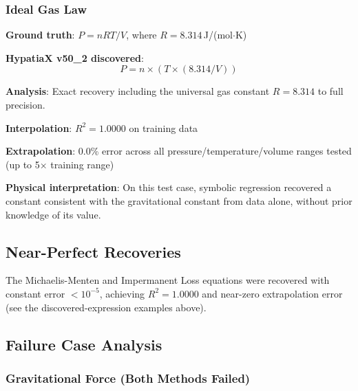\documentclass[twoside,11pt]{article}
\begin{document}
\subsubsection{Ideal Gas Law}

\begin{example}
\textbf{Ground truth}: $P = nRT/V$, where $R = 8.314$\,J/(mol$\cdot$K)

\textbf{HypatiaX v50\_2 discovered}:
\begin{equation}
P = n \times (T \times (8.314 / V))
\end{equation}

\textbf{Analysis}: Exact recovery including the universal gas constant $R = 8.314$ to full precision.

\textbf{Interpolation}: $R^2 = 1.0000$ on training data

\textbf{Extrapolation}: 0.0\% error across all pressure/temperature/volume ranges tested (up to 5$\times$ training range)

\textbf{Physical interpretation}: On this test case, symbolic regression recovered a constant consistent with the gravitational constant from data alone, without prior knowledge of its value\citep{lacava2021contemporary}.
\end{example}

\subsection{Near-Perfect Recoveries}

The Michaelis-Menten and Impermanent Loss equations were recovered with constant error $< 10^{-5}$, achieving $R^2 = 1.0000$ and near-zero extrapolation error (see the discovered-expression examples above).

\subsection{Failure Case Analysis}

\subsubsection{Gravitational Force (Both Methods Failed)}
\end{document}
